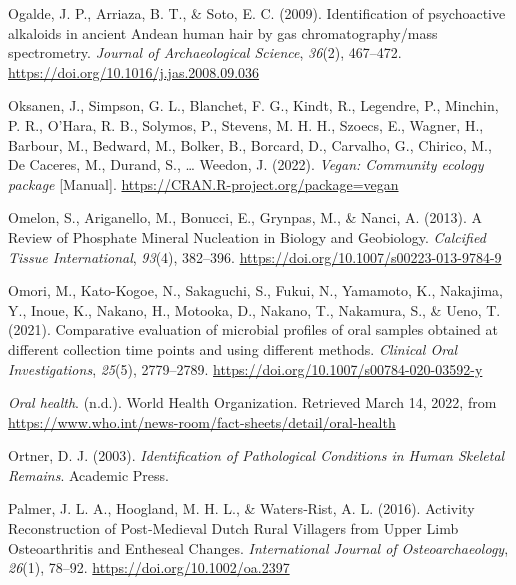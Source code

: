 \documentclass[
  letterpaper,
]{book}
\newlength{\cslhangindent}
\newlength{\cslentryspacingunit} %
\newenvironment{CSLReferences}[2] %
 {%
  \setlength{\parindent}{0pt}
  \ifodd #1
  \let\oldpar\par
  \def\par{\hangindent=\cslhangindent\oldpar}
  \fi
  \setlength{\parskip}{#2\cslentryspacingunit}
 }%
 {}
\begin{document}
\begin{CSLReferences}{1}{0}
\leavevmode{}%
Ogalde, J. P., Arriaza, B. T., \& Soto, E. C. (2009). Identification of
psychoactive alkaloids in ancient {Andean} human hair by gas
chromatography/mass spectrometry. \emph{Journal of Archaeological
Science}, \emph{36}(2), 467--472.
\url{https://doi.org/10.1016/j.jas.2008.09.036}

\leavevmode{}%
Oksanen, J., Simpson, G. L., Blanchet, F. G., Kindt, R., Legendre, P.,
Minchin, P. R., O'Hara, R. B., Solymos, P., Stevens, M. H. H., Szoecs,
E., Wagner, H., Barbour, M., Bedward, M., Bolker, B., Borcard, D.,
Carvalho, G., Chirico, M., De Caceres, M., Durand, S., \ldots{} Weedon,
J. (2022). \emph{Vegan: {Community} ecology package} {[}Manual{]}.
\url{https://CRAN.R-project.org/package=vegan}

\leavevmode{}%
Omelon, S., Ariganello, M., Bonucci, E., Grynpas, M., \& Nanci, A.
(2013). A {Review} of {Phosphate Mineral Nucleation} in {Biology} and
{Geobiology}. \emph{Calcified Tissue International}, \emph{93}(4),
382--396. \url{https://doi.org/10.1007/s00223-013-9784-9}

\leavevmode{}%
Omori, M., Kato-Kogoe, N., Sakaguchi, S., Fukui, N., Yamamoto, K.,
Nakajima, Y., Inoue, K., Nakano, H., Motooka, D., Nakano, T., Nakamura,
S., \& Ueno, T. (2021). Comparative evaluation of microbial profiles of
oral samples obtained at different collection time points and using
different methods. \emph{Clinical Oral Investigations}, \emph{25}(5),
2779--2789. \url{https://doi.org/10.1007/s00784-020-03592-y}

\leavevmode{}%
\emph{Oral health}. (n.d.). {World Health Organization}. Retrieved March
14, 2022, from
\url{https://www.who.int/news-room/fact-sheets/detail/oral-health}

\leavevmode{}%
Ortner, D. J. (2003). \emph{Identification of {Pathological Conditions}
in {Human Skeletal Remains}}. {Academic Press}.

\leavevmode{}%
Palmer, J. L. A., Hoogland, M. H. L., \& Waters‐Rist, A. L. (2016).
Activity {Reconstruction} of {Post}‐{Medieval Dutch Rural Villagers}
from {Upper Limb Osteoarthritis} and {Entheseal Changes}.
\emph{International Journal of Osteoarchaeology}, \emph{26}(1), 78--92.
\url{https://doi.org/10.1002/oa.2397}


\end{CSLReferences}
\end{document}
